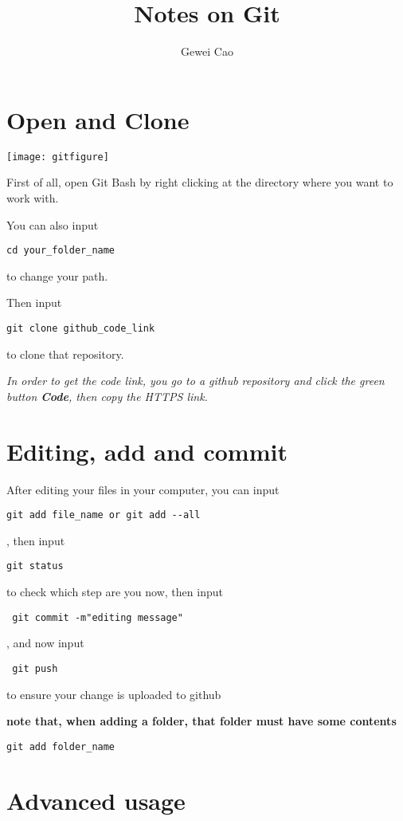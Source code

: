 \documentclass[UTF8]{article}
\title{Notes on Git}
\author{Gewei Cao}
\begin{document}
\maketitle
\section{Open and Clone}
\texttt{[image: gitfigure]}

First of all, open Git Bash by right clicking at the directory where you want to work with. 

You can also input 
\begin{verbatim}
cd your_folder_name
\end{verbatim}
to change your path. 

Then input 
\begin{verbatim}
git clone github_code_link
\end{verbatim}
 to clone that repository. 

\textit{In order to get the code link, you go to a github repository and click the green button \textbf{Code}, then copy the HTTPS link. }

\section{Editing, add and commit}
After editing your files in your computer, you can input \begin{verbatim}
git add file_name or git add --all \end{verbatim}, then input \begin{verbatim}
git status \end{verbatim} to check which step are you now, then input \begin{verbatim} git commit -m"editing message" \end{verbatim}, and now input \begin{verbatim} git push \end{verbatim} to ensure your change is uploaded to github

\textbf{note that, when adding a folder, that folder must have some contents}
\begin{verbatim}
git add folder_name
\end{verbatim}

\section{Advanced usage}
\end{document}
